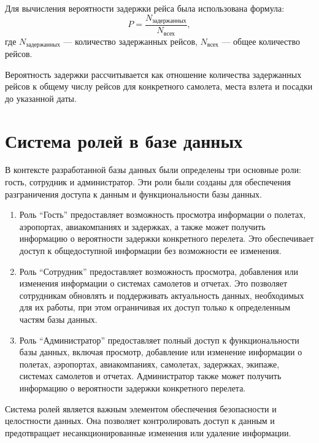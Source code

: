Для вычисления вероятности задержки рейса была использована формула:
\begin{equation}
    P = \frac{N_{\text{задержанных}}}{N_{\text{всех}}}, \label{eq:prob}
\end{equation}
где $N_{\text{задержанных}}$ --- количество задержанных рейсов, $N_{\text{всех}}$ --- общее количество рейсов.

Вероятность задержки рассчитывается как отношение количества задержанных рейсов к общему числу рейсов для конкретного самолета, места взлета и посадки до указанной даты.

\section{Система ролей в базе данных}

В контексте разработанной базы данных были определены три основные роли: гость, сотрудник и администратор.
Эти роли были созданы для обеспечения разграничения доступа к данным и функциональности базы данных.

\begin{enumerate}[label=---]
    \item Роль ``Гость'' предоставляет возможность просмотра информации о полетах, аэропортах, авиакомпаниях и задержках, а также может получить информацию о вероятности задержки конкретного перелета.
    Это обеспечивает доступ к общедоступной информации без возможности ее изменения.
    \item Роль ``Сотрудник'' предоставляет возможность просмотра, добавления или изменения информации о системах самолетов и отчетах.
    Это позволяет сотрудникам обновлять и поддерживать актуальность данных, необходимых для их работы, при этом ограничивая их доступ только к определенным частям базы данных.
    \item Роль ``Администратор'' предоставляет полный доступ к функциональности базы данных, включая просмотр, добавление или изменение информации о полетах, аэропортах, авиакомпаниях, самолетах, задержках, экипаже, системах самолетов и отчетах.
    Администратор также может получить информацию о вероятности задержки конкретного перелета.
\end{enumerate}

Система ролей является важным элементом обеспечения безопасности и целостности данных.
Она позволяет контролировать доступ к данным и предотвращает несанкционированные изменения или удаление информации.

